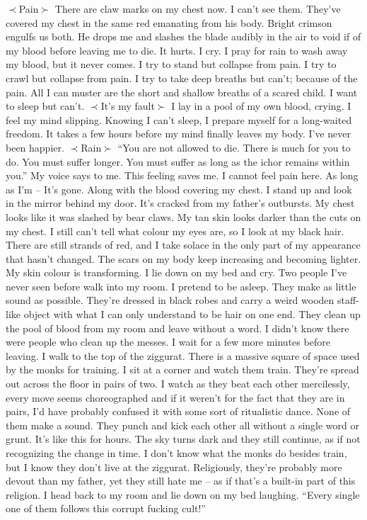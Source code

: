 \documentclass[openany, 12pt]{book}
\newcommand\tab[1][1cm]{\hspace*{#1}}
\begin{document}
\newline
$\prec$Pain$\succ$\newline
\tab
There are claw marks on my chest now. I can’t see them. They’ve covered my chest in the same red emanating from his body. Bright crimson engulfs us both. He drops me and slashes the blade audibly in the air to void if of my blood before leaving me to die. It hurts. I cry. I pray for rain to wash away my blood, but it never comes. I try to stand but collapse from pain. I try to crawl but collapse from pain. I try to take deep breaths but can’t; because of the pain. All I can muster are the short and shallow breaths of a scared child. I want to sleep but can’t.
\newline
$\prec$It's my fault$\succ$
\newline
\tab
I lay in a pool of my own blood, crying. I feel my mind slipping. Knowing I can’t sleep, I prepare myself for a long-waited freedom. It takes a few hours before my mind finally leaves my body. I’ve never been happier.\newline
$\prec$Rain$\succ$\newline
``You are not allowed to die. There is much for you to do. You must suffer longer. You must suffer as long as the ichor remains within you.'' My voice says to me. This feeling saves me. I cannot feel pain here. As long as I’m -- It’s gone. Along with the blood covering my chest. I stand up and look in the mirror behind my door. It’s cracked from my father’s outbursts. My chest looks like it was slashed by bear claws. My tan skin looks darker than the cuts on my chest. I still can’t tell what colour my eyes are, so I look at my black hair. There are still strands of red, and I take solace in the only part of my appearance that hasn’t changed. The scars on my body keep increasing and becoming lighter. My skin colour is transforming. I lie down on my bed and cry.
\newline
\tab
Two people I’ve never seen before walk into my room. I pretend to be asleep. They make as little sound as possible. They’re dressed in black robes and carry a weird wooden staff-like object with what I can only understand to be hair on one end. They clean up the pool of blood from my room and leave without a word. I didn’t know there were people who clean up the messes. I wait for a few more minutes before leaving.
\newline
\tab
I walk to the top of the ziggurat. There is a massive square of space used by the monks for training. I sit at a corner and watch them train. They’re spread out across the floor in pairs of two. I watch as they beat each other mercilessly, every move seems choreographed and if it weren’t for the fact that they are in pairs, I’d have probably confused it with some sort of ritualistic dance. None of them make a sound. They punch and kick each other all without a single word or grunt. It’s like this for hours. The sky turns dark and they still continue, as if not recognizing the change in time. I don’t know what the monks do besides train, but I know they don’t live at the ziggurat. Religiously, they’re probably more devout than my father, yet they still hate me -- as if that’s a built-in part of this religion. I head back to my room and lie down on my bed laughing. ``Every single one of them follows this corrupt fucking cult!'' 
\end{document}
